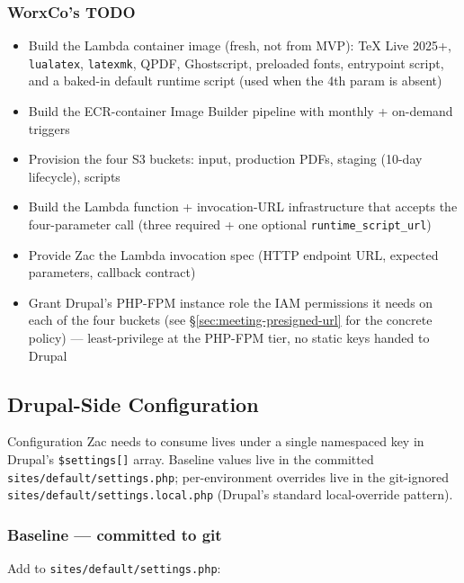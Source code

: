 \documentclass[11pt,letterpaper]{article}
\begin{document}
\subsubsection{WorxCo's TODO}
\begin{itemize}[nosep]
  \item Build the Lambda container image (fresh, not from MVP): TeX Live 2025+, \texttt{lualatex}, \texttt{latexmk}, QPDF, Ghostscript, preloaded fonts, entrypoint script, and a baked-in default runtime script (used when the 4th param is absent)
  \item Build the ECR-container Image Builder pipeline with monthly + on-demand triggers
  \item Provision the four S3 buckets: input, production PDFs, staging (10-day lifecycle), scripts
  \item Build the Lambda function + invocation-URL infrastructure that accepts the four-parameter call (three required + one optional \texttt{runtime\_script\_url})
  \item Provide Zac the Lambda invocation spec (HTTP endpoint URL, expected parameters, callback contract)
  \item Grant Drupal's PHP-FPM instance role the IAM permissions it needs on each of the four buckets (see \S\ref{sec:meeting-presigned-url} for the concrete policy) --- least-privilege at the PHP-FPM tier, no static keys handed to Drupal
\end{itemize}

\subsection{Drupal-Side Configuration}
\label{sec:meeting-drupal-config}

Configuration Zac needs to consume lives under a single namespaced key in Drupal's \texttt{\$settings[]} array. Baseline values live in the committed \texttt{sites/default/settings.php}; per-environment overrides live in the git-ignored \texttt{sites/default/settings.local.php} (Drupal's standard local-override pattern).

\subsubsection{Baseline — committed to git}
Add to \texttt{sites/default/settings.php}:
\end{document}
